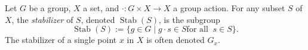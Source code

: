 \documentclass{article}
\begin{document}
Let $G$ be a group, $X$ a set, and $\cdot: G \times X \longrightarrow X$ a group action. For any subset $S$ of $X$, the {\em stabilizer} of $S$, denoted $\operatorname{Stab}(S)$, is the subgroup
$$
\operatorname{Stab}(S) := \{g \in G \mid g\cdot s \in S \text{for all }\ s \in S\}.
$$
The stabilizer of a single point $x$ in $X$ is often denoted $G_x$.
\end{document}
